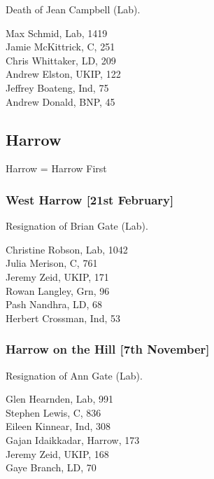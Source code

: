 \documentclass[a4paper,openany,10pt]{book}
\begin{document}
Death of Jean Campbell (Lab).



Max Schmid, Lab, 1419\\
Jamie McKittrick, C, 251\\
Chris Whittaker, LD, 209\\
Andrew Elston, UKIP, 122\\
Jeffrey Boateng, Ind, 75\\
Andrew Donald, BNP, 45\\


\subsection*{Harrow}

Harrow = Harrow First

\subsubsection*{West Harrow \hspace*{\fill}\nolinebreak[1]%
\enspace\hspace*{\fill}
[21st February]}


Resignation of Brian Gate (Lab).



Christine Robson, Lab, 1042\\
Julia Merison, C, 761\\
Jeremy Zeid, UKIP, 171\\
Rowan Langley, Grn, 96\\
Pash Nandhra, LD, 68\\
Herbert Crossman, Ind, 53\\


\subsubsection*{Harrow on the Hill \hspace*{\fill}\nolinebreak[1]%
\enspace\hspace*{\fill}
[7th November]}


Resignation of Ann Gate (Lab).



Glen Hearnden, Lab, 991\\
Stephen Lewis, C, 836\\
Eileen Kinnear, Ind, 308\\
Gajan Idaikkadar, Harrow, 173\\
Jeremy Zeid, UKIP, 168\\
Gaye Branch, LD, 70\\
\end{document}
